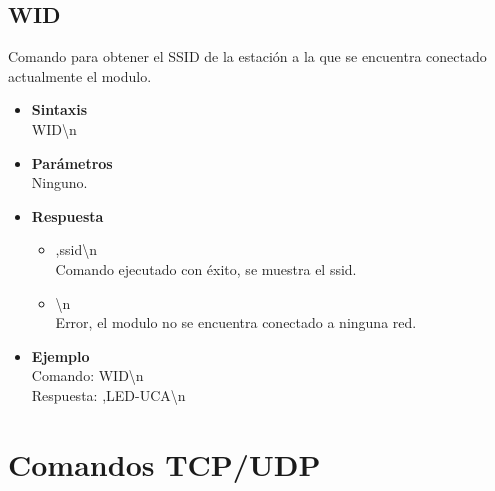 \documentclass[a4paper,spanish]{article}
\begin{document}
\subsection{WID}
Comando para obtener el SSID de la estación a la que se encuentra conectado actualmente el modulo.
\begin{itemize}
	\item \textbf{Sintaxis}\\
	{\ttfamily WID\textbackslash n}
	\item \textbf{Parámetros}\\
	Ninguno.
	\item \textbf{Respuesta}
	\begin{itemize}
		\item{,ssid\textbackslash n}\\
		Comando ejecutado con éxito, se muestra el ssid.
		\item{\textbackslash n} \\
		Error, el modulo no se encuentra conectado a ninguna red.
	\end{itemize}
	\item\textbf{Ejemplo}\\
	Comando: {\ttfamily WID\textbackslash n}\\
	Respuesta: {,LED-UCA\textbackslash n}
\end{itemize}













\section{Comandos TCP/UDP}
\end{document}
